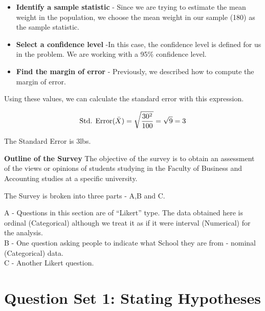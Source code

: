 \begin{itemize}
\item
\textbf{Identify a sample statistic} - Since we are trying to estimate the mean weight in the population, we choose the mean weight in our sample (180) as the sample statistic.


\item \textbf{Select a confidence level}  -In this case, the confidence level is defined for us in the problem. We are working with a 95\% confidence level.


\item \textbf{Find the margin of error} - Previously, we described how to compute the margin of error.
\end{itemize}





Using these values, we can calculate the standard error with this expression.

\vspace{0.1cm}
\[
\mbox{Std. Error}(\bar{X})  = \sqrt{{30^2\over 100}} = \sqrt{9}
= 3\]

\vspace{0.1cm}

The Standard Error is 3lbs.



\noindent  \textbf{Outline of the Survey}
The objective of the survey is to obtain an assessment of the views or opinions of students studying in the Faculty of Business and Accounting studies at a specific university.

\vspace{0.4cm}

The Survey is broken into three parts - A,B and C. \\ \vspace{0.2cm}

A - Questions in this section are of ``Likert'' type. The data obtained here is ordinal (Categorical) although we treat it as if it were interval (Numerical) for the analysis.\\
\vspace{0.2cm}
B - One question asking people to indicate what School they are from - nominal (Categorical) data.\\
\vspace{0.2cm}
C - Another Likert question.




\newpage
\section*{Question Set 1: Stating Hypotheses}


